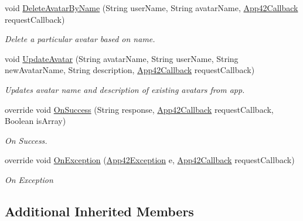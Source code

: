 \begin{DoxyCompactItemize}
void \hyperlink{classcom_1_1shephertz_1_1app42_1_1paas_1_1sdk_1_1windows_1_1avatar_1_1_avatar_service_a61bfc1392aeda849de4f663a29aee9c3}{Delete\+Avatar\+By\+Name} (String user\+Name, String avatar\+Name, \hyperlink{interfacecom_1_1shephertz_1_1app42_1_1paas_1_1sdk_1_1windows_1_1_app42_callback}{App42\+Callback} request\+Callback)
\begin{DoxyCompactList}\small\item\em Delete a particular avatar based on name. \end{DoxyCompactList}\item 
void \hyperlink{classcom_1_1shephertz_1_1app42_1_1paas_1_1sdk_1_1windows_1_1avatar_1_1_avatar_service_ad42cce3120dc56a25e1bbc277e7aab02}{Update\+Avatar} (String avatar\+Name, String user\+Name, String new\+Avatar\+Name, String description, \hyperlink{interfacecom_1_1shephertz_1_1app42_1_1paas_1_1sdk_1_1windows_1_1_app42_callback}{App42\+Callback} request\+Callback)
\begin{DoxyCompactList}\small\item\em Updates avatar name and description of existing avatars from app. \end{DoxyCompactList}\item 
override void \hyperlink{classcom_1_1shephertz_1_1app42_1_1paas_1_1sdk_1_1windows_1_1avatar_1_1_avatar_service_ad24eaef413ac9e129e0005644de071dc}{On\+Success} (String response, \hyperlink{interfacecom_1_1shephertz_1_1app42_1_1paas_1_1sdk_1_1windows_1_1_app42_callback}{App42\+Callback} request\+Callback, Boolean is\+Array)
\begin{DoxyCompactList}\small\item\em On Success. \end{DoxyCompactList}\item 
override void \hyperlink{classcom_1_1shephertz_1_1app42_1_1paas_1_1sdk_1_1windows_1_1avatar_1_1_avatar_service_a6b77f04a54eeba278c1f4373bcb7914c}{On\+Exception} (\hyperlink{classcom_1_1shephertz_1_1app42_1_1paas_1_1sdk_1_1windows_1_1_app42_exception}{App42\+Exception} e, \hyperlink{interfacecom_1_1shephertz_1_1app42_1_1paas_1_1sdk_1_1windows_1_1_app42_callback}{App42\+Callback} request\+Callback)
\begin{DoxyCompactList}\small\item\em On Exception \end{DoxyCompactList}\end{DoxyCompactItemize}
\subsection*{Additional Inherited Members}


